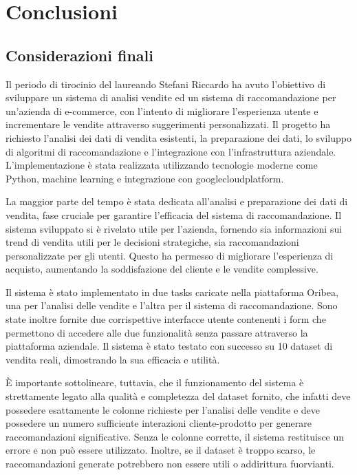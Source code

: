 \chapter{Conclusioni}
\label{cap:conclusioni}


\section{Considerazioni finali}

Il periodo di tirocinio del laureando Stefani Riccardo ha avuto l'obiettivo di sviluppare un sistema di analisi vendite ed un sistema di raccomandazione per un'azienda di e-commerce, con l'intento di migliorare l'esperienza utente e incrementare le vendite attraverso suggerimenti personalizzati. Il progetto ha richiesto l'analisi dei dati di vendita esistenti, la preparazione dei dati, lo sviluppo di algoritmi di raccomandazione e l'integrazione con l'infrastruttura aziendale. L'implementazione è stata realizzata utilizzando tecnologie moderne come Python, machine learning e integrazione con \gls{googlecloudplatform}.

La maggior parte del tempo è stata dedicata all'analisi e preparazione dei dati di vendita, fase cruciale per garantire l'efficacia del sistema di raccomandazione. Il sistema sviluppato si è rivelato utile per l'azienda, fornendo sia informazioni sui trend di vendita utili per le decisioni strategiche, sia raccomandazioni personalizzate per gli utenti. Questo ha permesso di migliorare l'esperienza di acquisto, aumentando la soddisfazione del cliente e le vendite complessive.

Il sistema è stato implementato in due tasks caricate nella piattaforma Oribea, una per l'analisi delle vendite e l'altra per il sistema di raccomandazione. Sono state inoltre fornite due corrispettive interfacce utente contenenti i form che permettono di accedere alle due funzionalità senza passare attraverso la piattaforma aziendale. Il sistema è stato testato con successo su 10 dataset di vendita reali, dimostrando la sua efficacia e utilità.

È importante sottolineare, tuttavia, che il funzionamento del sistema è strettamente legato alla qualità e completezza del dataset fornito, che infatti deve possedere esattamente le colonne richieste per l'analisi delle vendite e deve possedere un numero sufficiente interazioni cliente-prodotto per generare raccomandazioni significative. Senza le colonne corrette, il sistema restituisce un errore e non può essere utilizzato. Inoltre, se il dataset è troppo scarso, le raccomandazioni generate potrebbero non essere utili o addirittura fuorvianti.


